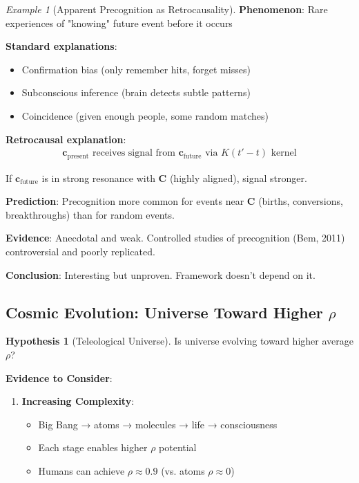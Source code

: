 \documentclass[11pt,a4paper]{article}
\theoremstyle{definition}
\newtheorem{hypothesis}{Hypothesis}[section]
\theoremstyle{remark}
\newtheorem{example}{Example}[section]
\newcommand{\cc}{\mathbf{c}}
\begin{document}
\begin{small}
\begin{enumerate}
\begin{example}[Apparent Precognition as Retrocausality]
\textbf{Phenomenon}: Rare experiences of "knowing" future event before it occurs

\textbf{Standard explanations}:
\begin{itemize}
    \item Confirmation bias (only remember hits, forget misses)
    \item Subconscious inference (brain detects subtle patterns)
    \item Coincidence (given enough people, some random matches)
\end{itemize}

\textbf{Retrocausal explanation}:
\begin{align}
\cc_{\text{present}} \text{ receives signal from } \cc_{\text{future}} \text{ via } K(t'-t) \text{ kernel}
\end{align}

If \(\cc_{\text{future}}\) is in strong resonance with \(\mathbf{C}\) (highly aligned), signal stronger.

\textbf{Prediction}: Precognition more common for events near \(\mathbf{C}\) (births, conversions, breakthroughs) than for random events.

\textbf{Evidence}: Anecdotal and weak. Controlled studies of precognition (Bem, 2011) controversial and poorly replicated.

\textbf{Conclusion}: Interesting but unproven. Framework doesn't depend on it.
\end{example}

\subsection{Cosmic Evolution: Universe Toward Higher \(\rho\)}

\begin{hypothesis}[Teleological Universe]
Is universe evolving toward higher average \(\rho\)?

\textbf{Evidence to Consider}:
\begin{enumerate}
    \item \textbf{Increasing Complexity}: 
        \begin{itemize}
            \item Big Bang → atoms → molecules → life → consciousness
            \item Each stage enables higher \(\rho\) potential
            \item Humans can achieve \(\rho \approx 0.9\) (vs. atoms \(\rho \approx 0\))
        \end{itemize}
    

\end{enumerate}
\end{hypothesis}
\end{enumerate}
\end{small}
\end{document}
